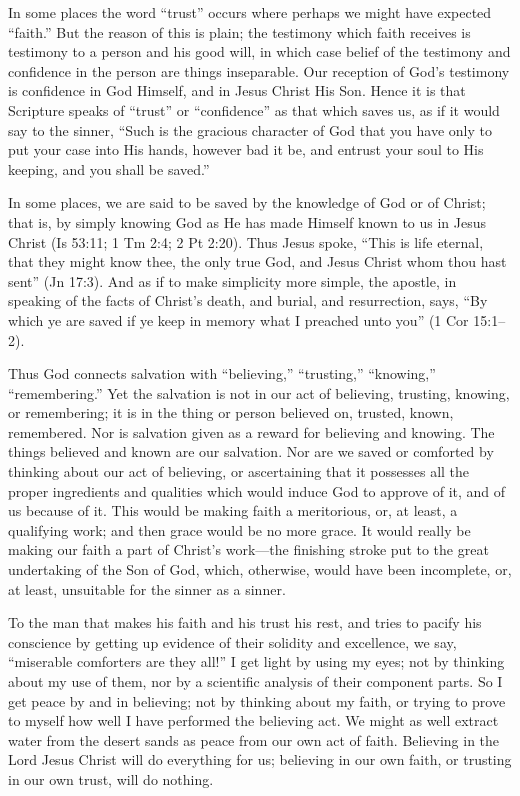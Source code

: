 \documentclass[
]{book}
\begin{document}
In some places the word ``trust'' occurs where perhaps we might have expected ``faith.'' But the reason of this is plain; the testimony which faith receives is testimony to a person and his good will, in which case belief of the testimony and confidence in the person are things inseparable. Our reception of God's testimony is confidence in God Himself, and in Jesus Christ His Son. Hence it is that Scripture speaks of ``trust'' or ``confidence'' as that which saves us, as if it would say to the sinner, ``Such is the gracious character of God that you have only to put your case into His hands, however bad it be, and entrust your soul to His keeping, and you shall be saved.''

In some places, we are said to be saved by the knowledge of God or of Christ; that is, by simply knowing God as He has made Himself known to us in Jesus Christ (Is 53:11; 1 Tm 2:4; 2 Pt 2:20). Thus Jesus spoke, ``This is life eternal, that they might know thee, the only true God, and Jesus Christ whom thou hast sent'' (Jn 17:3). And as if to make simplicity more simple, the apostle, in speaking of the facts of Christ's death, and burial, and resurrection, says, ``By which ye are saved if ye keep in memory what I preached unto you'' (1 Cor 15:1--2).

Thus God connects salvation with ``believing,'' ``trusting,'' ``knowing,'' ``remembering.'' Yet the salvation is not in our act of believing, trusting, knowing, or remembering; it is in the thing or person believed on, trusted, known, remembered. Nor is salvation given as a reward for believing and knowing. The things believed and known are our salvation. Nor are we saved or comforted by thinking about our act of believing, or ascertaining that it possesses all the proper ingredients and qualities which would induce God to approve of it, and of us because of it. This would be making faith a meritorious, or, at least, a qualifying work; and then grace would be no more grace. It would really be making our faith a part of Christ's work---the finishing stroke put to the great undertaking of the Son of God, which, otherwise, would have been incomplete, or, at least, unsuitable for the sinner as a sinner.

To the man that makes his faith and his trust his rest, and tries to pacify his conscience by getting up evidence of their solidity and excellence, we say, ``miserable comforters are they all!'' I get light by using my eyes; not by thinking about my use of them, nor by a scientific analysis of their component parts. So I get peace by and in believing; not by thinking about my faith, or trying to prove to myself how well I have performed the believing act. We might as well extract water from the desert sands as peace from our own act of faith. Believing in the Lord Jesus Christ will do everything for us; believing in our own faith, or trusting in our own trust, will do nothing.
\end{document}
